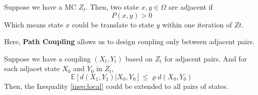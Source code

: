 \begin{define}
  Suppose we have a MC $Z_t$.
  Then, two state $x, y\in\Omega$ are adjacent if
  \[P(x, y) > 0\]
  Which means state $x$ could be translate to state $y$ within one iteration of $Zt$.
\end{define}

Here, \textbf{Path Coupling} allows us to design coupling only between adjacent pairs.
\begin{lemma}
  Suppose we have a coupling $(X_t, Y_t)$ based on $Z_t$ for adjacent pairs.
  And for each adjacet state $X_0$ and $Y_0$ in $Z_t$,
  \begin{equation}
  \mathbb{E}[d(X_1, Y_1)|X_0, Y_0] \leq \varrho d(X_0, Y_0)\label{ineq:local}
  \end{equation}
  Then, the Inequality \ref{ineq:local} could be extended to all pairs of states.
\end{lemma}

